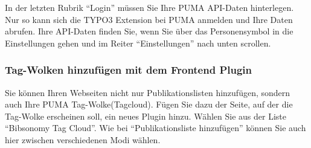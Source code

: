 In der letzten Rubrik \enquote{Login} müssen Sie Ihre PUMA API-Daten hinterlegen. Nur so kann sich die TYPO3 Extension bei PUMA anmelden und Ihre Daten abrufen. Ihre API-Daten finden Sie, wenn Sie über das Personensymbol in die Einstellungen gehen und im Reiter \enquote{Einstellungen} nach unten scrollen. 
\subsubsection*{Tag-Wolken hinzufügen mit dem Frontend Plugin}\label{sss:typo3Tagwolken}
Sie können Ihren Webseiten nicht nur Publikationslisten hinzufügen, sondern auch Ihre PUMA  Tag-Wolke(Tagcloud). Fügen Sie dazu der Seite, auf der die Tag-Wolke erscheinen soll, ein neues Plugin hinzu. Wählen Sie aus der Liste \enquote{Bibsonomy Tag Cloud}.\newline \newline 
Wie bei \enquote{Publikationsliste hinzufügen} können Sie auch hier zwischen verschiedenen Modi wählen.\newline \newline 
